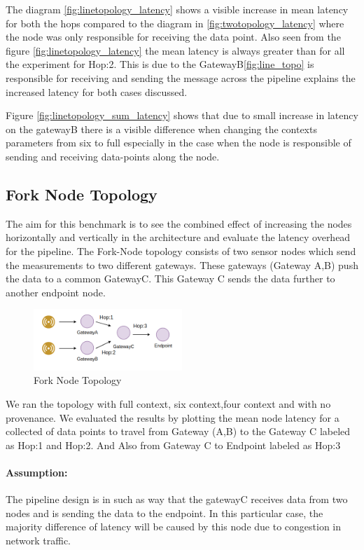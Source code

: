 The diagram \ref{fig:linetopology_latency}  shows a visible increase in mean latency for both the hops compared to the diagram in \ref{fig:twotopology_latency} where the node was only responsible for receiving the data point. Also seen from the figure \ref{fig:linetopology_latency} the mean latency is always greater than for all the experiment for Hop:2. This is due to the GatewayB\ref{fig:line_topo} is responsible for receiving and sending the message across the pipeline explains the increased latency for both cases discussed.

Figure \ref{fig:linetopology_sum_latency} shows that due to small increase in latency on the gatewayB there is a visible difference when changing the contexts parameters from six to full especially in the case when the node is responsible of sending and receiving data-points along the node.

\subsection{Fork Node Topology}
The aim for this benchmark is to see the combined effect of increasing the nodes horizontally and vertically in the architecture and evaluate the latency overhead for the pipeline. The Fork-Node topology consists of two sensor nodes which send the measurements to two different gateways. These gateways (Gateway A,B) push the data to a common GatewayC. This Gateway C sends the data further to another endpoint node.

\begin{figure}[H]
	\center
	\includegraphics[width=0.5\textwidth]{figures/latencytopo_fork.png}
	\caption{Fork Node Topology}
	\label{fig:fork_topo}
\end{figure}

We ran the topology with full context, six context,four context and with no provenance. We evaluated the results by plotting the mean node latency for a collected of data points
to travel from Gateway (A,B) to the Gateway C labeled as Hop:1  and Hop:2. And Also from Gateway C to Endpoint labeled as Hop:3

\paragraph*{Assumption:}
The pipeline design is in such as way that the gatewayC receives data from two nodes and is sending the data to the endpoint. In this particular case, the majority difference of latency will be caused by this node due to congestion in network traffic.

